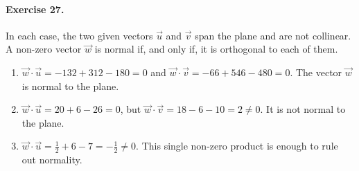 \paragraph{Exercise 27.} In each case, the two given vectors $\vec u$ and $\vec v$ span the plane and are not collinear. A non-zero vector $\vec w$ is normal if, and only if, it is orthogonal to each of them.
\begin{enumerate}
\item $\vec w\cdot\vec u=-132+312-180=0$ and $\vec w\cdot\vec v=-66+546-480=0$. The vector $\vec w$ is normal to the plane.
\item $\vec w\cdot\vec u=20+6-26=0$, but $\vec w\cdot\vec v=18-6-10=2\ne0$. It is not normal to the plane.
\item $\vec w\cdot\vec u=\frac12+6-7=-\frac12\ne0$. This single non-zero product is enough to rule out normality.
\end{enumerate}

\fi

